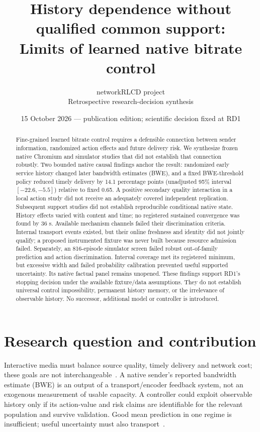 \documentclass[10pt]{article}
\title{History dependence without qualified common support:\\
Limits of learned native bitrate control}
\author{networkRLCD project\\Retrospective research-decision synthesis}
\date{15 October 2026 --- publication edition; scientific decision fixed at RD1}
\begin{document}
\maketitle

\begin{abstract}
Fine-grained learned bitrate control requires a defensible connection between
sender information, randomized action effects and future delivery risk. We
synthesize frozen native Chromium and simulator studies that did not establish
that connection robustly. Two bounded native causal findings anchor the result:
randomized early service history changed later bandwidth estimates (BWE), and
a fixed BWE-threshold policy reduced timely delivery by 14.1 percentage points
(unadjusted 95\% interval $[-22.6,-5.5]$) relative to fixed 0.65. A positive
secondary quality interaction in a local action study did not receive an
adequately covered independent replication. Subsequent support studies did not
establish reproducible conditional native state. History effects varied with
content and time; no registered sustained convergence was found by 36 s.
Available mechanism channels failed their discrimination criteria. Internal
transport events existed, but their online freshness and identity did not
jointly qualify; a proposed instrumented fixture was never built because
resource admission failed. Separately, an 816-episode simulator screen failed
robust out-of-family prediction and action discrimination. Interval coverage
met its registered minimum, but excessive width and failed probability
calibration prevented useful supported uncertainty. Its native factual panel
remains unopened. These findings support RD1's stopping decision under the
available fixture/data assumptions. They do not establish universal control
impossibility, permanent history memory, or the irrelevance of observable
history. No successor, additional model or controller is introduced.
\end{abstract}

\section{Research question and contribution}
Interactive media must balance source quality, timely delivery and network cost;
these goals are not interchangeable~\cite{rfc8836}. A native sender's reported
bandwidth estimate (BWE) is an output of a transport/encoder feedback system,
not an exogenous measurement of usable capacity. A controller could exploit
observable history only if its action-value and risk claims are identifiable
for the relevant population and survive validation. Good mean prediction in one
regime is insufficient; useful uncertainty must also transport~\cite{ovadia}.
\end{document}
